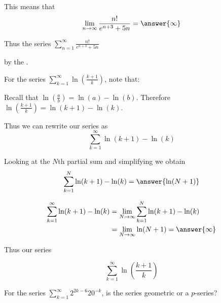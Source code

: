 \documentclass{ximera}
\begin{document}
\begin{exercise}
\begin{hint}
\begin{question}
This means that 
\[
\lim_{n \to \infty} \frac{n!}{e^{n+3}+5n}=\answer{ \infty}
\]

Thus the series $\sum^{\infty}_{n=1} \frac{n!}{e^{n+3}+5n}$

by the
.


\end{question}

\begin{question}
For the series $\sum_{k=1}^{\infty} \ln\left(\frac{k+1}{k}\right)$, note that:

\begin{multipleChoice}
\end{multipleChoice}

Recall that $\ln \left(\frac{a}{b}\right)=\ln(a)-\ln(b)$. Therefore $\ln\left(\frac{k+1}{k}\right)=\ln(k+1)-\ln(k)$. 

Thus we can rewrite our series as 
\[
\sum^{\infty}_{k=1} \ln(k+1)-\ln(k)
\]


Looking at the $N$th partial sum and simplifying we obtain 
\[
\sum^{N}_{k=1} \ln(k+1)-\ln(k)=\answer{\ln(N+1)}
\]

\begin{align*}
\sum^{\infty}_{k=1} \ln(k+1)-\ln(k)&=\lim_{N \to \infty} \sum^{N}_{k=1} \ln(k+1)-\ln(k) \\
&=\lim_{N \to \infty} \ln(N+1)=\answer{\infty}
\end{align*}

Thus our series

\[
\sum^{\infty}_{k=1} \ln\left(\frac{k+1}{k}\right)
\]

\begin{multipleChoice}
\end{multipleChoice}


\end{question}

\begin{question}
For the series $\sum_{k=1}^{\infty} 2^{2k-6}20^{-k}$, is the series geometric or a $p$-series?


\end{question}
\end{hint}
\end{exercise}
\end{document}

